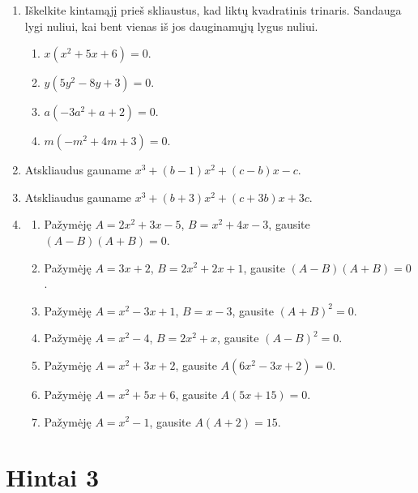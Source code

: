 \documentclass[11pt,a4paper]{scrartcl}
\begin{document}
\begin{enumerate}[label=\textbf{\arabic*.}, leftmargin=*]
    \item Iškelkite kintamąjį prieš skliaustus, kad liktų kvadratinis trinaris. Sandauga lygi nuliui, kai bent vienas iš jos dauginamųjų lygus nuliui.
    \begin{enumerate}[label={(\arabic*)}]
        \item $x(x^2+5x+6)=0$.
        \item $y(5y^2-8y+3)=0$.
        \item $a(-3a^2+a+2)=0$.
        \item $m(-m^2+4m+3)=0$.
    \end{enumerate}
        \item Atskliaudus gauname $x^3+(b-1)x^2+(c-b)x-c$.
        \item Atskliaudus gauname $x^3+(b+3)x^2+(c+3b)x+3c$.

    \item
    \begin{enumerate}[label={(\arabic*)}]
        \item Pažymėję $A=2x^2+3x-5$, $B=x^2+4x-3$, gausite $(A-B)(A+B)=0$.
        \item Pažymėję $A=3x+2$, $B=2x^2+2x+1$, gausite $(A-B)(A+B)=0$.
        \item Pažymėję $A=x^2-3x+1$, $B=x-3$, gausite $(A+B)^2=0$.
        \item Pažymėję $A=x^2-4$, $B=2x^2+x$, gausite $(A-B)^2=0$.
        \item Pažymėję $A=x^2+3x+2$, gausite $A(6x^2-3x+2)=0$.
        \item Pažymėję $A=x^2+5x+6$, gausite $A(5x+15)=0$.
        \item Pažymėję $A=x^2-1$, gausite $A(A+2)=15$.
    \end{enumerate}
\end{enumerate}

\newpage
\section{Hintai 3}
\end{document}
